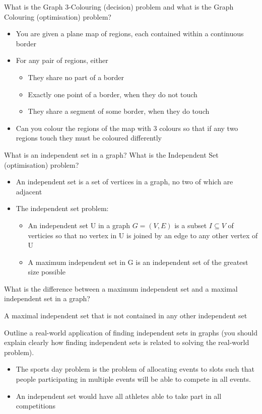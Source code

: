 \documentclass{exam}
\begin{document}
\begin{questions}
\question[4]What is the Graph 3-Colouring (decision) problem and what is the
Graph Colouring (optimisation) problem? 
\begin{solution}[2in]
	\begin{itemize}
		\item You are given a plane map of regions, each contained within a continuous border
		\item For any pair of regions, either
		\begin{itemize}
			\item They share no part of a border
			\item Exactly one point of a border, when they do not touch
			\item They share a segment of some border, when they do touch
		\end{itemize}
		\item Can you colour the regions of the map with 3 colours so that if any two regions touch they must be coloured differently
	\end{itemize}
\end{solution}
\newpage
\question[3]What is an independent set in a graph? What is the Independent Set
(optimisation) problem?
\begin{solution}[2in]
	\begin{itemize}
		\item An independent set is a set of vertices in a graph, no two of which are adjacent
		\item The independent set problem:
		\begin{itemize}
			\item An independent set U in a graph $G=(V,E)$ is a subset $I\subseteq V$ of verticies so that no vertex in U is joined by an edge to any other vertex of U
			\item A maximum independent set in G is an independent set of the greatest size possible
		\end{itemize}
	\end{itemize}	
\end{solution}

\question[2]What is the difference between a maximum independent set and a
maximal independent set in a graph?
\begin{solution}[2in]
	A maximal independent set that is not contained in any other independent set
\end{solution}

\question[5]Outline a real-world application of finding independent sets in graphs
(you should explain clearly how finding independent sets is related to
solving the real-world problem).
\begin{solution}[2in]
	\begin{itemize}
		\item The sports day problem is the problem of allocating events to slots such that people participating in multiple events will be able to compete in all events.
		\item An independent set would have all athletes able to take part in all competitions
	\end{itemize}	
\end{solution}



\end{questions}
\end{document}
